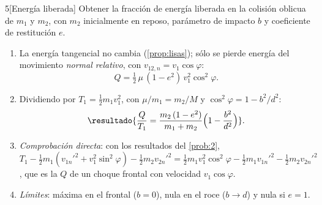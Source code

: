 \begin{problema}{5}[Energía liberada]
\label{prob:5}
Obtener la fracción de energía liberada en la colisión oblicua de $m_{1}$ y $m_{2}$, con $m_{2}$
inicialmente en reposo, parámetro de impacto $b$ y coeficiente de restitución $e$.
\end{problema}

\begin{resolucion}
\begin{enumerate}
  \item La energía tangencial no cambia (\cref{prop:lisas}); sólo se pierde energía del
        movimiento \emph{normal relativo}, con $v_{12,n}=v_{1}\cos\varphi$:
        \[
          Q=\tfrac12\,\mu\,(1-e^{2})\,v_{1}^{2}\cos^{2}\varphi .
        \]
  \item Dividiendo por $T_{1}=\tfrac12m_{1}v_{1}^{2}$, con $\mu/m_{1}=m_{2}/M$ y $\cos^{2}\varphi=1-b^{2}/d^{2}$:
        \[
          \resultado{\frac{Q}{T_{1}}=\frac{m_{2}\,(1-e^{2})}{m_{1}+m_{2}}\Bigl(1-\frac{b^{2}}{d^{2}}\Bigr)} .
        \]
  \item \emph{Comprobación directa}: con los resultados del \cref{prob:2},
        $T_{1}-\tfrac12m_{1}(v_{1n}'^{2}+v_{1}^{2}\sin^{2}\varphi)-\tfrac12m_{2}v_{2n}'^{2}
        =\tfrac12m_{1}v_{1}^{2}\cos^{2}\varphi-\tfrac12m_{1}v_{1n}'^{2}-\tfrac12m_{2}v_{2n}'^{2}$, que es la $Q$
        de un choque frontal con velocidad $v_{1}\cos\varphi$.
  \item \emph{Límites}: máxima en el frontal ($b=0$), nula en el roce ($b\to d$) y nula si $e=1$.\qedhere
\end{enumerate}
\end{resolucion}

